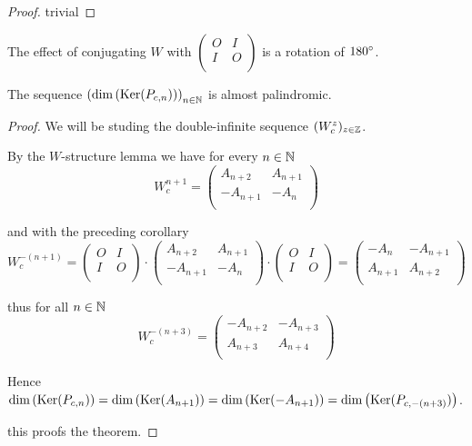 \begin{proof}
  trivial
\end{proof}

\begin{remark}
  The effect of conjugating $W$ with 
  $\left(\begin{smallmatrix} O & I \\ I & O \\\end{smallmatrix}\right)$
  is a rotation of $180^{\circ}$.
\end{remark}

\begin{theorem}
  The sequence $\left(\dim\left(\operatorname{Ker}(P_{c,n})\right)\right)_{n\in\mathbb{N}}$
  is almost palindromic.
\end{theorem}

\begin{proof}
  We will be studing the double-infinite sequence
  $(W_{c}^{z})_{z\in\mathbb{Z}}$.

  By the $W$-structure lemma we have for every $n\in\mathbb{N}$
  \[
  W_{c}^{n+1}
  =
  \left(
  \begin{array}{cc}
     A_{n+2} &  A_{n+1} \\
    -A_{n+1} & -A_{n}   \\
  \end{array}
  \right)  
  \]

  and with the preceding corollary
  \[
  W_{c}^{-(n+1)}
  =
  \left(
  \begin{array}{cc}
    O & I \\
    I & O \\
  \end{array}
  \right)
  \cdot
  \left(
  \begin{array}{cc}
     A_{n+2} &  A_{n+1} \\
    -A_{n+1} & -A_{n}   \\
  \end{array}
  \right)  
  \cdot
  \left(
  \begin{array}{cc}
    O & I \\
    I & O \\
  \end{array}
  \right)
  =
  \left(
  \begin{array}{cc}
    -A_{n}  & -A_{n+1} \\
     A_{n+1} & A_{n+2} \\
  \end{array}
  \right)  
  \]

  thus for all $n\in\mathbb{N}$
  \[
  W_{c}^{-(n+3)}
  =
  \left(
  \begin{array}{cc}
    -A_{n+2}  & -A_{n+3} \\
     A_{n+3} & A_{n+4} \\
  \end{array}
  \right)
  \]

  Hence $\dim\left(\operatorname{Ker}(P_{c,n})\right) =
  \dim\left(\operatorname{Ker}(A_{n+1})\right) = 
  \dim\left(\operatorname{Ker}(-A_{n+1})\right) = 
  \dim\left(\operatorname{Ker}(P_{c,-(n+3)})\right)$.

  this proofs the theorem.
\end{proof}
